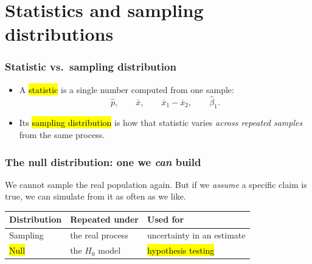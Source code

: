 \documentclass[slidestop,compress,mathserif]{beamer}
\begin{document}
\section{Statistics and sampling distributions}
\begin{frame}
\frametitle{Statistic vs.\ sampling distribution}

\begin{itemize}
\item A \hl{statistic} is a single number computed from one sample:
\[
\widehat{p}, \qquad \bar{x}, \qquad \bar{x}_1 - \bar{x}_2, \qquad \widehat\beta_1 .
\]
\item Its \hl{sampling distribution} is how that statistic varies \emph{across repeated samples} from the same process.
\end{itemize}

\pause
{}

\pause
\vspace{-0.5em}

\end{frame}
\begin{frame}
\frametitle{The null distribution: one we \emph{can} build}

We cannot sample the real population again. But if we \emph{assume} a specific claim is true, we can simulate from it as often as we like.

\vspace{0.4em}
\begin{center}
\begin{tabular}{lll}
\toprule
Distribution & Repeated under & Used for \\
\midrule
Sampling & the real process & uncertainty in an estimate \\
\hl{Null} & the $H_0$ model & \hl{hypothesis testing} \\
\bottomrule
\end{tabular}
\end{center}

\vspace{0.5em}

\end{frame}
\end{document}
